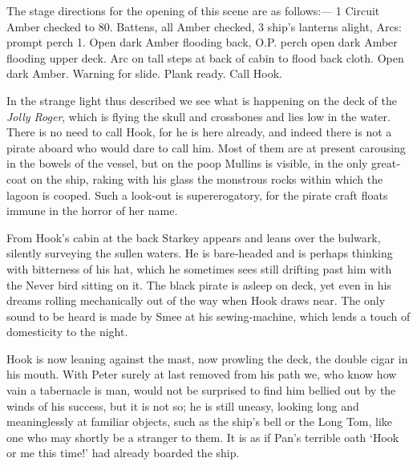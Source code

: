 
\act


\begin{Settings}
The stage directions for the opening of this scene are as follows:—%
1 Circuit Amber checked to 80.
Battens, all Amber checked,
3 ship’s lanterns alight,
Arcs: prompt perch 1.
Open dark Amber flooding back,
O.P. perch open dark Amber flooding upper deck.
Arc on tall steps at back of cabin to flood back cloth.
Open dark Amber.
Warning for slide.
Plank ready.
Call Hook.

In the strange light thus described we see what is happening on the deck of the \emph{Jolly Roger},
which is flying the skull and crossbones and lies low in the water.
There is no need to call Hook, for he is here already,
and indeed there is not a pirate aboard who would dare to call him.
Most of them are at present carousing in the bowels of the vessel,
but on the poop Mullins is visible, in the only great‐coat on the ship,
raking with his glass the monstrous rocks within which the lagoon is cooped.
Such a look‐out is supererogatory, for the pirate craft floats immune in the horror of her name.

From Hook’s cabin at the back Starkey appears and leans over the bulwark,
silently surveying the sullen waters.
He is bare‐headed and is perhaps thinking with bitterness of his hat,
which he sometimes sees still drifting past him with the Never bird sitting on it.
The black pirate is asleep on deck,
yet even in his dreams rolling mechanically out of the way when Hook draws near.
The only sound to be heard is made by Smee at his sewing‐machine,
which lends a touch of domesticity to the night.

Hook is now leaning against the mast, now prowling the deck, the double cigar in his mouth.
With Peter surely at last removed from his path we, who know how vain a tabernacle is man,
would not be surprised to find him bellied out by the winds of his success, but it is not so;
he is still uneasy, looking long and meaninglessly at familiar objects, such as the ship’s bell or the Long Tom,
like one who may shortly be a stranger to them.
It is as if Pan’s terrible oath ‘Hook or me this time!’ had already boarded the ship.
\end{Settings}

